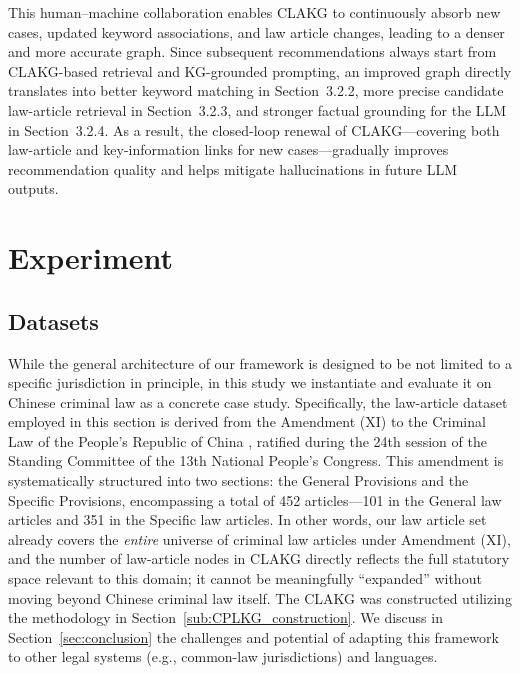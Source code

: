 \documentclass[review,times,nonatbib]{elsarticle} %
\renewcommand{\textcolor}[2]{#2}
\begin{document}
\textcolor{blue}{This human--machine collaboration enables CLAKG to continuously absorb new cases, updated keyword associations, and law article changes, leading to a denser and more accurate graph. Since subsequent recommendations always start from CLAKG-based retrieval and KG-grounded prompting, an improved graph directly translates into better keyword matching in Section~3.2.2, more precise candidate law-article retrieval in Section~3.2.3, and stronger factual grounding for the LLM in Section~3.2.4. As a result, the closed-loop renewal of CLAKG---covering both law-article and key-information links for new cases---gradually improves recommendation quality and helps mitigate hallucinations in future LLM outputs.}




\section{Experiment}
\label{sec:experiment}

\subsection{Datasets}

\textcolor{blue}{While the general architecture of our framework is designed to be not limited to a specific jurisdiction in principle, in this study we instantiate and evaluate it on Chinese criminal law as a concrete case study.} Specifically, the law-article dataset employed in this section is derived from the Amendment (XI) to the Criminal Law of the People’s Republic of China \cite{NPC2020}, ratified during the 24th session of the Standing Committee of the 13th National People’s Congress. This amendment is systematically structured into two sections: the General Provisions and the Specific Provisions, encompassing a total of 452 articles—101 in the General law articles and 351 in the Specific law articles. In other words, our law article set already covers the \emph{entire} universe of criminal law articles under Amendment (XI), and the number of law-article nodes in CLAKG directly reflects the full statutory space relevant to this domain; it cannot be meaningfully “expanded” without moving beyond Chinese criminal law itself. The CLAKG was constructed utilizing the methodology in Section~\ref{sub:CPLKG_construction}. \textcolor{blue}{We discuss in Section~\ref{sec:conclusion} the challenges and potential of adapting this framework to other legal systems (e.g., common-law jurisdictions) and languages.}\\
\end{document}
